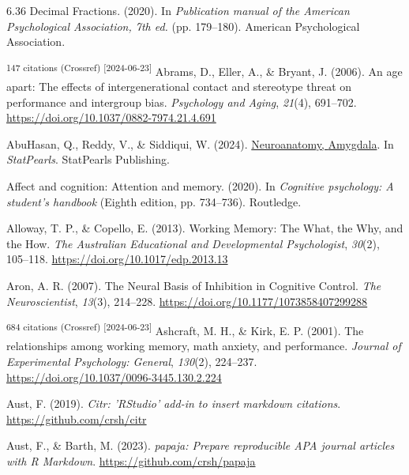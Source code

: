 \documentclass[
  stu, a4paper,floatsintext]{apa7}
\newlength{\cslhangindent}
\newenvironment{CSLReferences}[2] %
 {\begin{list}{}{%
  \setlength{\itemindent}{0pt}
  \setlength{\leftmargin}{0pt}
  \setlength{\parsep}{0pt}
  \ifodd #1
   \setlength{\leftmargin}{\cslhangindent}
   \setlength{\itemindent}{-1\cslhangindent}
  \fi
  \setlength{\itemsep}{#2\baselineskip}}}
 {\end{list}}
\begin{document}
\label{refs}
\begin{CSLReferences}{1}{0}
6.36 {Decimal Fractions}. (2020). In \emph{Publication manual of the {American Psychological Association}, 7th ed.} (pp. 179--180). American Psychological Association.

\textsuperscript{147 citations (Crossref) {[}2024-06-23{]}} Abrams, D., Eller, A., \& Bryant, J. (2006). An age apart: {The} effects of intergenerational contact and stereotype threat on performance and intergroup bias. \emph{Psychology and Aging}, \emph{21}(4), 691--702. \url{https://doi.org/10.1037/0882-7974.21.4.691}

AbuHasan, Q., Reddy, V., \& Siddiqui, W. (2024). \href{https://www.ncbi.nlm.nih.gov/pubmed/30725787}{Neuroanatomy, {Amygdala}}. In \emph{{StatPearls}}. StatPearls Publishing.

Affect and cognition: Attention and memory. (2020). In \emph{Cognitive psychology: A student's handbook} (Eighth edition, pp. 734--736). Routledge.

Alloway, T. P., \& Copello, E. (2013). Working {Memory}: {The What}, the {Why}, and the {How}. \emph{The Australian Educational and Developmental Psychologist}, \emph{30}(2), 105--118. \url{https://doi.org/10.1017/edp.2013.13}

Aron, A. R. (2007). The {Neural Basis} of {Inhibition} in {Cognitive Control}. \emph{The Neuroscientist}, \emph{13}(3), 214--228. \url{https://doi.org/10.1177/1073858407299288}

\textsuperscript{684 citations (Crossref) {[}2024-06-23{]}} Ashcraft, M. H., \& Kirk, E. P. (2001). The relationships among working memory, math anxiety, and performance. \emph{Journal of Experimental Psychology: General}, \emph{130}(2), 224--237. \url{https://doi.org/10.1037/0096-3445.130.2.224}

Aust, F. (2019). \emph{Citr: 'RStudio' add-in to insert markdown citations}. \url{https://github.com/crsh/citr}

Aust, F., \& Barth, M. (2023). \emph{{papaja}: {Prepare} reproducible {APA} journal articles with {R Markdown}}. \url{https://github.com/crsh/papaja}


\end{CSLReferences}
\end{document}
